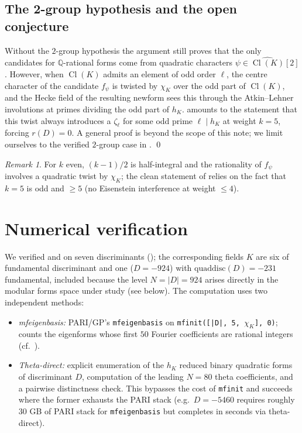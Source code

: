 \documentclass[11pt]{amsart}
\theoremstyle{definition}
\theoremstyle{remark}
\newtheorem{remark}[theorem]{Remark}
\DeclareMathOperator{\Cl}{Cl}
\newcommand{\Q}{\mathbb{Q}}
\newcommand{\chiK}{\chi_K}
\begin{document}
\subsection{The 2-group hypothesis and the open conjecture}
Without the \(2\)-group hypothesis the argument still proves that the
only candidates for \(\Q\)-rational forms come from quadratic
characters \(\psi \in \widehat{\Cl(K)}[2]\). However, when
\(\Cl(K)\) admits an element of odd order \(\ell\), the centre
character of the candidate \(f_\psi\) is twisted by \(\chiK\) over the
odd part of \(\Cl(K)\), and the Hecke field of the resulting newform
sees this through the Atkin--Lehner involutions at primes dividing the
odd part of \(h_K\).  amounts to the statement that
this twist always introduces a \(\zeta_\ell\) for some odd prime
\(\ell \mid h_K\) at weight \(k = 5\), forcing \(r(D) = 0\). A general
proof is beyond the scope of this note; we limit ourselves to the
verified \(2\)-group case in . \qed

\begin{remark}\label{rem:k}
For \(k\) even, \((k-1)/2\) is half-integral and the rationality of
\(f_\psi\) involves a quadratic twist by \(\chiK\); the clean
statement of  relies on the fact that \(k = 5\) is odd
and \(\ge 5\) (no Eisenstein interference at weight \(\le 4\)).
\end{remark}

\section{Numerical verification}\label{sec:numerical}

We verified  and  on seven discriminants
(); the corresponding fields \(K\) are six of
fundamental discriminant and one (\(D = -924\)) with
\(\mathrm{quaddisc}(D) = -231\) fundamental, included because the
level \(N = |D| = 924\) arises directly in the modular forms space
under study (see  below). The computation uses two
independent methods:
\begin{itemize}
  \item \emph{mfeigenbasis:} PARI/GP's \texttt{mfeigenbasis} on
    \texttt{mfinit([|D|, 5, $\chiK$], 0)}; counts the eigenforms whose
    first \(50\) Fourier coefficients are rational integers
    (cf.\ ).
  \item \emph{Theta-direct:} explicit enumeration of the \(h_K\)
    reduced binary quadratic forms of discriminant \(D\), computation
    of the leading \(N = 80\) theta coefficients, and a pairwise
    distinctness check. This bypasses the cost of \texttt{mfinit} and
    succeeds where the former exhausts the PARI stack
    (e.g.\ \(D = -5460\) requires roughly \(30\) GB of PARI stack for
    \texttt{mfeigenbasis} but completes in seconds via theta-direct).
\end{itemize}
\end{document}
